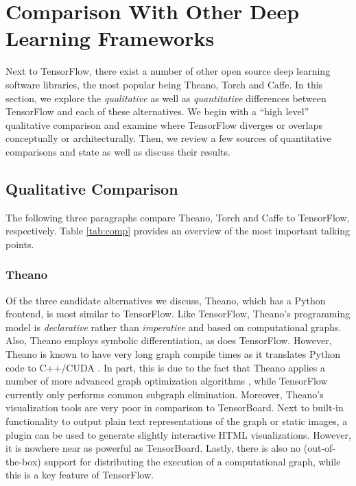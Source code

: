 \section{Comparison With Other Deep Learning Frameworks}\label{sec:comp}

Next to TensorFlow, there exist a number of other open source deep learning
software libraries, the most popular being Theano, Torch and Caffe. In this
section, we explore the \emph{qualitative} as well as \emph{quantitative}
differences between TensorFlow and each of these alternatives. We begin with a
``high level'' qualitative comparison and examine where TensorFlow diverges or
overlaps conceptually or architecturally. Then, we review a few sources of
quantitative comparisons and state as well as discuss their results.

\subsection{Qualitative Comparison}\label{sec:comp-quality}

The following three paragraphs compare Theano, Torch and Caffe to TensorFlow,
respectively. Table \ref{tab:comp} provides an overview of the most important
talking points.

\subsubsection{Theano}\label{sec:comp-quality-theano}

Of the three candidate alternatives we discuss, Theano, which has a Python
frontend, is most similar to TensorFlow. Like TensorFlow, Theano's programming
model is \emph{declarative} rather than \emph{imperative} and based on
computational graphs. Also, Theano employs symbolic differentiation, as does
TensorFlow. However, Theano is known to have very long graph compile times as it
translates Python code to C++/CUDA \cite{theano}. In part, this is due to the
fact that Theano applies a number of more advanced graph optimization algorithms
\cite{theano}, while TensorFlow currently only performs common subgraph
elimination. Moreover, Theano's visualization tools are very poor in comparison
to TensorBoard. Next to built-in functionality to output plain text
representations of the graph or static images, a plugin can be used to generate
slightly interactive HTML visualizations. However, it is nowhere near as
powerful as TensorBoard. Lastly, there is also no (out-of-the-box) support for
distributing the execution of a computational graph, while this is a key feature
of TensorFlow.

